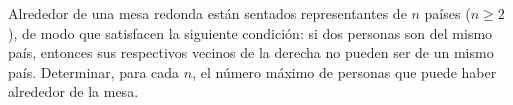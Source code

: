 Alrededor de una mesa redonda están sentados representantes de $n$ países ($n \geq 2$), de modo que satisfacen la siguiente condición: si dos personas son del mismo país, entonces sus respectivos vecinos de la derecha no pueden ser de un mismo país. Determinar, para cada $n$, el número máximo de personas que puede haber alrededor de la mesa.
